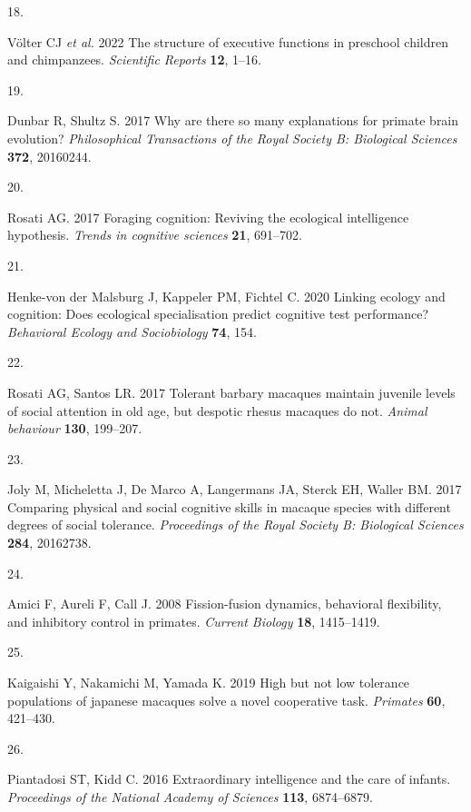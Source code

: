 \documentclass[
  man,floatsintext]{apa6}
\newlength{\cslhangindent}
\newlength{\csllabelwidth}
\newenvironment{CSLReferences}[2] %
 {\begin{list}{}{%
  \setlength{\itemindent}{0pt}
  \setlength{\leftmargin}{0pt}
  \setlength{\parsep}{0pt}
  \ifodd #1
   \setlength{\leftmargin}{\cslhangindent}
   \setlength{\itemindent}{-1\cslhangindent}
  \fi
  \setlength{\itemsep}{#2\baselineskip}}}
 {\end{list}}
\newcommand{\CSLLeftMargin}[1]{\parbox[t]{\csllabelwidth}{\strut#1\strut}}
\newcommand{\CSLRightInline}[1]{\parbox[t]{\linewidth - \csllabelwidth}{\strut#1\strut}}
\begin{document}
\begin{CSLReferences}{0}{1}
\CSLLeftMargin{18. }%
\CSLRightInline{Völter CJ \emph{et al.} 2022 The structure of executive functions in preschool children and chimpanzees. \emph{Scientific Reports} \textbf{12}, 1--16.}

\CSLLeftMargin{19. }%
\CSLRightInline{Dunbar R, Shultz S. 2017 Why are there so many explanations for primate brain evolution? \emph{Philosophical Transactions of the Royal Society B: Biological Sciences} \textbf{372}, 20160244.}

\CSLLeftMargin{20. }%
\CSLRightInline{Rosati AG. 2017 Foraging cognition: Reviving the ecological intelligence hypothesis. \emph{Trends in cognitive sciences} \textbf{21}, 691--702.}

\CSLLeftMargin{21. }%
\CSLRightInline{Henke-von der Malsburg J, Kappeler PM, Fichtel C. 2020 Linking ecology and cognition: Does ecological specialisation predict cognitive test performance? \emph{Behavioral Ecology and Sociobiology} \textbf{74}, 154.}

\CSLLeftMargin{22. }%
\CSLRightInline{Rosati AG, Santos LR. 2017 Tolerant barbary macaques maintain juvenile levels of social attention in old age, but despotic rhesus macaques do not. \emph{Animal behaviour} \textbf{130}, 199--207.}

\CSLLeftMargin{23. }%
\CSLRightInline{Joly M, Micheletta J, De Marco A, Langermans JA, Sterck EH, Waller BM. 2017 Comparing physical and social cognitive skills in macaque species with different degrees of social tolerance. \emph{Proceedings of the Royal Society B: Biological Sciences} \textbf{284}, 20162738.}

\CSLLeftMargin{24. }%
\CSLRightInline{Amici F, Aureli F, Call J. 2008 Fission-fusion dynamics, behavioral flexibility, and inhibitory control in primates. \emph{Current Biology} \textbf{18}, 1415--1419.}

\CSLLeftMargin{25. }%
\CSLRightInline{Kaigaishi Y, Nakamichi M, Yamada K. 2019 High but not low tolerance populations of japanese macaques solve a novel cooperative task. \emph{Primates} \textbf{60}, 421--430.}

\CSLLeftMargin{26. }%
\CSLRightInline{Piantadosi ST, Kidd C. 2016 Extraordinary intelligence and the care of infants. \emph{Proceedings of the National Academy of Sciences} \textbf{113}, 6874--6879.}


\end{CSLReferences}
\end{document}
